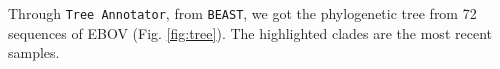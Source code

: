 \documentclass[11pt]{paper}
\begin{document}
	Through \texttt{Tree Annotator}, from \texttt{BEAST}, we got the phylogenetic tree from 72 sequences of EBOV (Fig. \ref{fig:tree}). 
	The highlighted clades are the most recent samples.  
	
	
	
\printbibliography

\pagebreak


\end{document}
